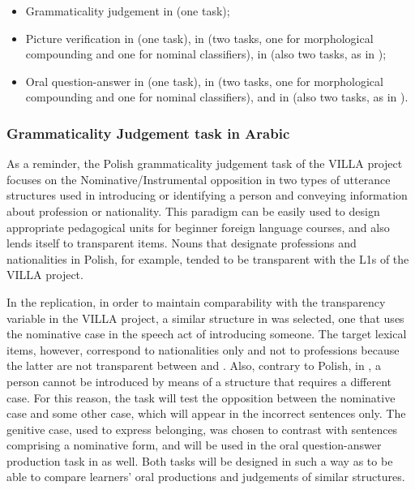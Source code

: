 \documentclass[output=paper,colorlinks,citecolor=brown,modfonts,nonflat]{../langscibook}
\begin{document}
\begin{itemize}
    \item Grammaticality judgement in  (one task);
    \item Picture verification in  (one task), in  (two tasks, one for morphological compounding and one for nominal classifiers), in  (also two tasks, as in );
    \item Oral question-answer in  (one task), in  (two tasks, one for morphological compounding and one for nominal classifiers), and in  (also two tasks, as in ).
\end{itemize}

\subsubsection{Grammaticality Judgement task in Arabic}\label{sec:watorek:4.2.1}

As a reminder, the Polish grammaticality judgement task of the VILLA project focuses on the Nominative/Instrumental opposition in two types of utterance structures used in introducing or identifying a person and conveying information about profession or nationality. This paradigm can be easily used to design appropriate pedagogical units for beginner foreign language courses, and also lends itself to transparent items. Nouns that designate professions and nationalities in Polish, for example, tended to be transparent with the L1s of the VILLA project. 

In the  replication, in order to maintain comparability with the transparency variable in the VILLA project, a similar structure in  was selected, one that uses the nominative case in the speech act of introducing someone. The target lexical items, however, correspond to nationalities only and not to professions because the latter are not transparent between  and . Also, contrary to Polish, in , a person cannot be introduced by means of a structure that requires a different case. For this reason, the task will test the opposition between the nominative case and some other case, which will appear in the incorrect sentences only. The genitive case, used to express belonging, was chosen to contrast with sentences comprising a nominative form, and will be used in the oral question-answer production task in  as well. Both tasks will be designed in such a way as to be able to compare learners’ oral productions and judgements of similar structures. 
\end{document}

